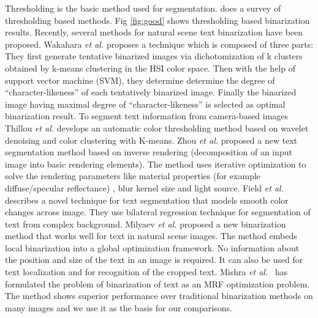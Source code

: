 Thresholding is the basic method used for segmentation.
\cite{chap2-23} does a survey of thresholding based methods. Fig \ref{fig:good}
shows thresholding based binarization results. 
Recently, several methods for natural scene text binarization have been proposed.
Wakahara {\em et al.} \cite{chap2-24} proposes a technique which is composed of three parts:
They first generate tentative binarized images 
via dichotomization of k clusters obtained by k-means clustering in the HSI color space.
Then with the help of support vector machine (SVM), they determine
determine the degree of ``character-likeness'' of
each tentatively binarized image. Finally the binarized image having maximal degree
of ``character-likeness'' is selected as optimal binarization result.
To segment text information from camera-based images Thillou {\em et al.}
\cite{chap2-25} develops an automatic color thresholding method 
based on wavelet denoising and color clustering with K-means. 
Zhou {\em et al.} \cite{chap2-26} proposed a new text segmentation method based
on inverse rendering (decomposition of an input image into basic
rendering elements). The method uses iterative optimization to
solve the rendering parameters like material properties (for example diffuse/specular reflectance)
, blur kernel size and light source.
Field {\em et al.} \cite{chap2-27} describes
a novel technique for text segmentation that models smooth
color changes across image. They use bilateral regression technique for segmentation of
text from complex background.
Milyaev {\em et al.} \cite{chap4-4} proposed a new binarization method that works well for text in
natural scene images. The method embeds local binarization into
a global optimization framework. No information about the position and size of the text in an
image is required. It can also be used for text localization and for
recognition of the cropped text.
Mishra {\em et al.}~\cite{A16} has formulated the problem of binarization of text as an MRF optimization problem. 
The method shows superior performance over traditional binarization methods on many images and we use it as the
basis for our comparisons.

